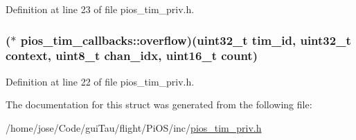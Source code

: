 Definition at line 23 of file pios\-\_\-tim\-\_\-priv.\-h.

\hypertarget{structpios__tim__callbacks_a7e55f8bf5b5867b790dc9bf1e929ac6f}{
\subsubsection[{overflow}]{($\ast$ pios\-\_\-tim\-\_\-callbacks\-::overflow)({\bf uint32\-\_\-t} tim\-\_\-id, {\bf uint32\-\_\-t} context, {\bf uint8\-\_\-t} chan\-\_\-idx, {\bf uint16\-\_\-t} count)}}\label{structpios__tim__callbacks_a7e55f8bf5b5867b790dc9bf1e929ac6f}


Definition at line 22 of file pios\-\_\-tim\-\_\-priv.\-h.



The documentation for this struct was generated from the following file\-:\begin{DoxyCompactItemize}
\item 
/home/jose/\-Code/gui\-Tau/flight/\-Pi\-O\-S/inc/\hyperlink{pios__tim__priv_8h}{pios\-\_\-tim\-\_\-priv.\-h}\end{DoxyCompactItemize}
